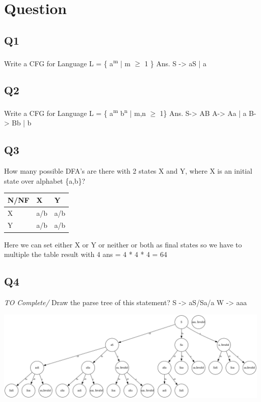 \documentclass[11pt]{article}
\begin{document}
\section{Question}
\label{sec:org6567898}
\subsection{Q1}
\label{sec:orga72f52d}
Write a CFG for Language L = \{ a\textsuperscript{m} | m \(\ge\) 1 \}
Ans. S -> aS | a
\subsection{Q2}
\label{sec:org42a03fd}
Write a CFG for Language L = \{ a\textsuperscript{m} b\textsuperscript{n} | m,n \(\ge\) 1\}
Ans. S-> AB 
     A-> Aa | a 
     B-> Bb | b
\subsection{Q3}
\label{sec:org6e48c41}
How many possible DFA's are there with 2 states X and Y, where X is an initial state over alphabet \{a,b\}?
\begin{center}
\begin{tabular}{lll}
\hline
N/NF & X & Y\\[0pt]
\hline
X & a/b & a/b\\[0pt]
Y & a/b & a/b\\[0pt]
\hline
\end{tabular}
\end{center}
Here we can set either X or Y or neither or both as final states so we have to multiple the table result with 4
ans = 4 * 4 * 4 = 64
\subsection{Q4}
\label{sec:org5014881}
\emph{\emph{\emph{\emph{TO Complete/}}}}
Draw the parse tree of this statement?
S -> aS/Sa/a
W -> aaa

\begin{center}
\includegraphics[width=.9\linewidth]{Revision/Q4.png}
\end{center}
\end{document}
